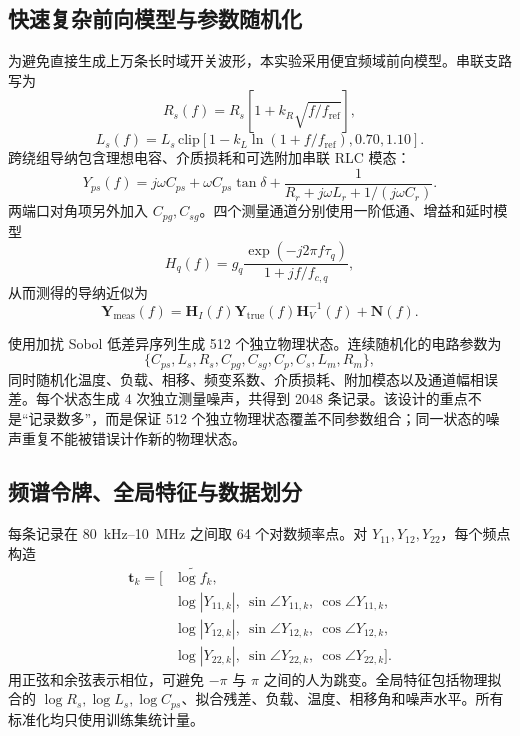 \documentclass[UTF8,a4paper,12pt]{ctexart}
\begin{document}
\subsection{快速复杂前向模型与参数随机化}

为避免直接生成上万条长时域开关波形，本实验采用便宜频域前向模型。串联支路写为
\begin{equation}
R_s(f)=R_s\left[1+k_R\sqrt{f/f_{\mathrm{ref}}}\right],
\end{equation}
\begin{equation}
L_s(f)=L_s\,\mathrm{clip}\left[1-k_L\ln(1+f/f_{\mathrm{ref}}),0.70,1.10\right].
\end{equation}
跨绕组导纳包含理想电容、介质损耗和可选附加串联 RLC 模态：
\begin{equation}
Y_{ps}(f)=j\omega C_{ps}+\omega C_{ps}\tan\delta
+\frac{1}{R_r+j\omega L_r+1/(j\omega C_r)}.
\end{equation}
两端口对角项另外加入 $C_{pg},C_{sg}$。四个测量通道分别使用一阶低通、增益和延时模型
\begin{equation}
H_q(f)=g_q\frac{\exp(-j2\pi f\tau_q)}{1+jf/f_{c,q}},
\end{equation}
从而测得的导纳近似为
\begin{equation}
\mathbf Y_{\mathrm{meas}}(f)=
\mathbf H_I(f)\mathbf Y_{\mathrm{true}}(f)\mathbf H_V^{-1}(f)+\mathbf N(f).
\end{equation}

使用加扰 Sobol 低差异序列生成 512 个独立物理状态。连续随机化的电路参数为
\[
\{C_{ps},L_s,R_s,C_{pg},C_{sg},C_p,C_s,L_m,R_m\},
\]
同时随机化温度、负载、相移、频变系数、介质损耗、附加模态以及通道幅相误差。每个状态生成 4 次独立测量噪声，共得到 2048 条记录。该设计的重点不是“记录数多”，而是保证 512 个独立物理状态覆盖不同参数组合；同一状态的噪声重复不能被错误计作新的物理状态。

\subsection{频谱令牌、全局特征与数据划分}

每条记录在 \SI{80}{kHz}--\SI{10}{MHz} 之间取 64 个对数频率点。对 $Y_{11},Y_{12},Y_{22}$，每个频点构造
\begin{equation}
\begin{aligned}
\mathbf t_k=\big[&\widetilde{\log f_k},\\
&\log|Y_{11,k}|,\ \sin\angle Y_{11,k},\ \cos\angle Y_{11,k},\\
&\log|Y_{12,k}|,\ \sin\angle Y_{12,k},\ \cos\angle Y_{12,k},\\
&\log|Y_{22,k}|,\ \sin\angle Y_{22,k},\ \cos\angle Y_{22,k}\big].
\end{aligned}
\end{equation}
用正弦和余弦表示相位，可避免 $-\pi$ 与 $\pi$ 之间的人为跳变。全局特征包括物理拟合的 $\log R_s,\log L_s,\log C_{ps}$、拟合残差、负载、温度、相移角和噪声水平。所有标准化均只使用训练集统计量。
\end{document}
